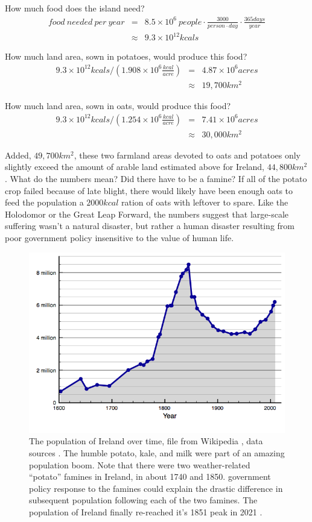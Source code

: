 \documentclass[12pt]{iopart}
\newcommand{\bea}{\begin{eqnarray}}
\newcommand{\eea}{\end{eqnarray}}
\begin{document}
How much food does the island need?
\bea
food~needed~per~year &=& 8.5\times10^6~people
	\cdot \frac{3000}{person\cdot day }
	\cdot \frac{365days}{year} \nonumber \\
&\approx& 9.3\times 10^{12} kcals \nonumber
\eea       

How much land area, sown in potatoes, would produce this food?
\bea
9.3\times10^{12}kcals /\left(1.908\times 10^6\frac{kcal}{acre}\right) &=& 4.87\times10^6 acres \nonumber\\
 &\approx& 19,700 km^2 \nonumber
\eea

How much land area, sown in oats, would produce this food?
\bea
9.3\times10^{12}kcals /\left(1.254\times10^6\frac{kcal}{acre}\right) &=& 7.41 \times10^6 acres \nonumber \\
 &\approx& 30,000 km^2 \nonumber
\eea

Added, $49,700km^2$, these two farmland areas devoted to oats and potatoes only slightly exceed the amount of arable land estimated above for Ireland, $44,800km^2$ \cite{arable_percentage}.  What do the numbers mean?  Did there have to be a famine?  If all of the potato crop failed because of late blight, there would likely have been enough oats to feed the population a $2000kcal$ ration of oats with leftover to spare.  
Like the Holodomor or the Great Leap Forward, the numbers suggest that large-scale suffering wasn't  a natural disaster, but rather a human disaster resulting from poor government policy insensitive to the value of human life.    



\begin{figure}[ht!]
\centering
\includegraphics[width=\columnwidth]{Population_of_Ireland_since_1600.png}
\caption{
The population of Ireland over time, file from Wikipedia \cite{pop_image}, data sources \cite{pop_sources}. The humble potato, kale, and milk were part of an amazing population boom.  Note that there were two weather-related ``potato'' famines in Ireland, in about 1740 and 1850.  government policy response to the famines could explain the drastic difference in subsequent population following each of the two famines.  The population of Ireland finally re-reached it's 1851 peak in 2021 \cite{Ireland_5M}.  
}
\label{ireland_population}
\end{figure}
\end{document}
